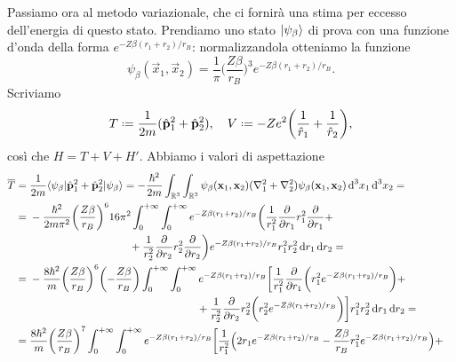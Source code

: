 Passiamo ora al metodo variazionale, che ci fornirà una stima per eccesso dell'energia di questo stato.
Prendiamo uno stato $\lvert\psi_\beta\rangle$ di prova con una funzione d'onda della forma $e^{-Z\beta(r_1+r_2)/r_B}$: normalizzandola otteniamo la funzione
\begin{equation}
    \psi_\beta(\vec x_1,\vec x_2)=\frac1{\pi}\biggl(\frac{Z\beta}{r_B}\biggr)^3e^{-Z\beta(r_1+r_2)/r_B}.
    \label{eq:funzione-prova-stato-fondamentale-elio}
\end{equation}
Scriviamo
\begin{equation}
    T\defeq\frac1{2m}(\op{\vec p}_1^2+\op{\vec p}_2^2),\quad
    V\defeq-Ze^2\biggl(\frac1{\op r_1}+\frac1{\op r_2}\biggr),
\end{equation}
cos\`i che $H=T+V+H'$.
Abbiamo i valori di aspettazione
\begin{equation}
    \begin{split}
        \avg{T}&=
        \frac1{2m}\bra{\psi_\beta}\op{\vec p}_1^2+\op{\vec p}_2^2\ket{\psi_\beta}=
        -\frac{\hbar^2}{2m}\int_{\R^3}\int_{\R^3}\psi_\beta(\vec x_1,\vec x_2)(\lap_1+\lap_2)\psi_\beta(\vec x_1,\vec x_2)\,\dd^3 x_1\,\dd^3 x_2=\\&=
        \begin{multlined}[t]
            -\frac{\hbar^2}{2m\pi^2}\biggl(\frac{Z\beta}{r_B}\biggr)^616\pi^2\int_0^{+\infty}\int_0^{+\infty}e^{-Z\beta(r_1+r_2)/r_B}\biggl(\frac1{r_1^2}\drp{}{r_1}r_1^2\drp{}{r_1}+\\
            +\frac1{r_2^2}\drp{}{r_2}r_2^2\drp{}{r_2}\biggr)e^{-Z\beta(r_1+r_2)/r_B}r_1^2r_2^2\,\dd r_1\,\dd r_2=
        \end{multlined}\\&=
        \begin{multlined}[t]
            -\frac{8\hbar^2}{m}\biggl(\frac{Z\beta}{r_B}\biggr)^6\biggl(-\frac{Z\beta}{r_B}\biggr)\int_0^{+\infty}\int_0^{+\infty}e^{-Z\beta(r_1+r_2)/r_B}\biggl[\frac1{r_1^2}\drp{}{r_1}\biggl(r_1^2e^{-Z\beta(r_1+r_2)/r_B}\biggr)+\\
            +\frac1{r_2^2}\drp{}{r_2}r_2^2\biggl(r_2^2e^{-Z\beta(r_1+r_2)/r_B}\biggr)\biggr]r_1^2r_2^2\,\dd r_1\,\dd r_2=
        \end{multlined}\\&=
        \begin{multlined}[t]
            \frac{8\hbar^2}{m}\biggl(\frac{Z\beta}{r_B}\biggr)^7\int_0^{+\infty}\int_0^{+\infty}e^{-Z\beta(r_1+r_2)/r_B}\biggl[\frac1{r_1^2}\Bigl(2r_1e^{-Z\beta(r_1+r_2)/r_B}-\frac{Z\beta}{r_B}r_1^2e^{-Z\beta(r_1+r_2)/r_B}\Bigr)+\\

\end{multlined}
\end{split}
\end{equation}
